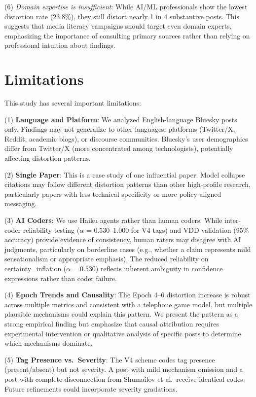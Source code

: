 \documentclass[twocolumn,11pt]{article}
\begin{document}
(6) \textit{Domain expertise is insufficient}: While AI/ML professionals show the lowest distortion rate (23.8\%), they still distort nearly 1 in 4 substantive posts. This suggests that media literacy campaigns should target even domain experts, emphasizing the importance of consulting primary sources rather than relying on professional intuition about findings.

\section{Limitations}

This study has several important limitations:

(1) \textbf{Language and Platform}: We analyzed English-language Bluesky posts only. Findings may not generalize to other languages, platforms (Twitter/X, Reddit, academic blogs), or discourse communities. Bluesky's user demographics differ from Twitter/X (more concentrated among technologists), potentially affecting distortion patterns.

(2) \textbf{Single Paper}: This is a case study of one influential paper. Model collapse citations may follow different distortion patterns than other high-profile research, particularly papers with less technical specificity or more policy-aligned messaging.

(3) \textbf{AI Coders}: We use Haiku agents rather than human coders. While inter-coder reliability testing ($\alpha$ = 0.530--1.000 for V4 tags) and VDD validation (95\% accuracy) provide evidence of consistency, human raters may disagree with AI judgments, particularly on borderline cases (e.g., whether a claim represents mild sensationalism or appropriate emphasis). The reduced reliability on certainty\_inflation ($\alpha = 0.530$) reflects inherent ambiguity in confidence expressions rather than coder failure.

(4) \textbf{Epoch Trends and Causality}: The Epoch 4--6 distortion increase is robust across multiple metrics and consistent with a telephone game model, but multiple plausible mechanisms could explain this pattern. We present the pattern as a strong empirical finding but emphasize that causal attribution requires experimental intervention or qualitative analysis of specific posts to determine which mechanisms dominate.

(5) \textbf{Tag Presence vs.\ Severity}: The V4 scheme codes tag presence (present/absent) but not severity. A post with mild mechanism omission and a post with complete disconnection from Shumailov et al.\ receive identical codes. Future refinements could incorporate severity gradations.
\end{document}
